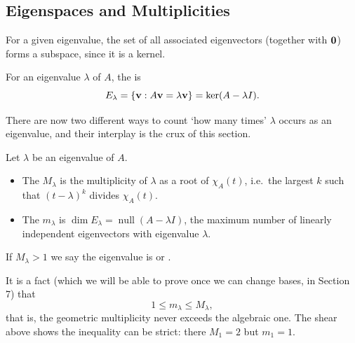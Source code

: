 \documentclass[a4paper]{scrartcl}
\newcommand{\nullity}{\operatorname{null}}
\begin{document}
\subsection{Eigenspaces and Multiplicities}

For a given eigenvalue, the set of all associated eigenvectors (together with $\mathbf{0}$) forms a subspace, since it is a kernel.

\begin{definition}[Eigenspace]
	For an eigenvalue $\lambda$ of $A$, the  is
	$$
	E_\lambda = \{ \mathbf{v} : A \mathbf{v} = \lambda \mathbf{v}\} = \ker(A - \lambda I).
	$$
\end{definition}

There are now two different ways to count `how many times' $\lambda$ occurs as an eigenvalue, and their interplay is the crux of this section.

\begin{definition}
	Let $\lambda$ be an eigenvalue of $A$.
	\begin{itemize}
		\item The  $M_\lambda$ is the multiplicity of $\lambda$ as a root of $\chi_A(t)$, i.e.\ the largest $k$ such that $(t - \lambda)^k$ divides $\chi_A(t)$.
		\item The  $m_\lambda$ is $\dim E_\lambda = \nullity(A - \lambda I)$, the maximum number of linearly independent eigenvectors with eigenvalue $\lambda$.
	\end{itemize}
	If $M_\lambda > 1$ we say the eigenvalue is  or .
\end{definition}

It is a fact (which we will be able to prove once we can change bases, in Section 7) that
$$
1 \leq m_\lambda \leq M_\lambda,
$$
that is, the geometric multiplicity never exceeds the algebraic one. The shear above shows the inequality can be strict: there $M_1 = 2$ but $m_1 = 1$.
\end{document}
